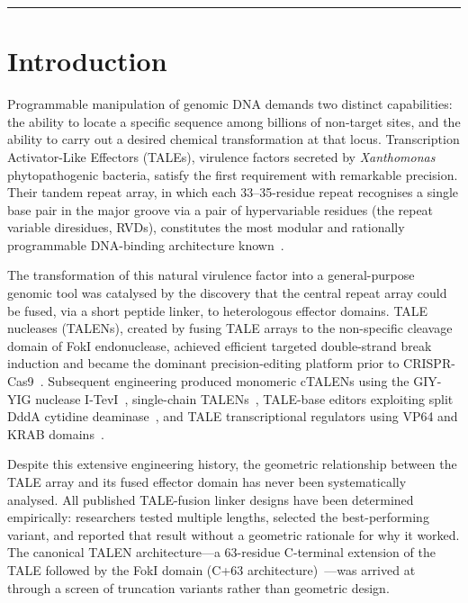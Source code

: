 \documentclass[11pt,a4paper]{article}
\begin{document}
\noindent\rule{\linewidth}{0.4pt}
\vspace{0.5em}

\section{Introduction}
\label{sec:intro}

Programmable manipulation of genomic DNA demands two distinct capabilities: the
ability to locate a specific sequence among billions of non-target sites, and the
ability to carry out a desired chemical transformation at that locus. Transcription
Activator-Like Effectors (TALEs), virulence factors secreted by \textit{Xanthomonas}
phytopathogenic bacteria, satisfy the first requirement with remarkable precision.
Their tandem repeat array, in which each 33--35-residue repeat recognises a single
base pair in the major groove via a pair of hypervariable residues (the repeat variable
diresidues, RVDs), constitutes the most modular and rationally programmable DNA-binding
architecture known~\citep{Boch2009, Moscou2009}.

The transformation of this natural virulence factor into a general-purpose genomic tool
was catalysed by the discovery that the central repeat array could be fused, via a short
peptide linker, to heterologous effector domains. TALE nucleases (TALENs), created by
fusing TALE arrays to the non-specific cleavage domain of FokI endonuclease, achieved
efficient targeted double-strand break induction and became the dominant precision-editing
platform prior to CRISPR-Cas9~\citep{Miller2011, Cermak2011}. Subsequent engineering
produced monomeric cTALENs using the GIY-YIG nuclease I-TevI~\citep{Beurdeley2013},
single-chain TALENs~\citep{Sun2014}, TALE-base editors exploiting split DddA cytidine
deaminase~\citep{Mok2020}, and TALE transcriptional regulators using VP64 and KRAB
domains~\citep{Zhang2011, Garg2012}.

Despite this extensive engineering history, the geometric relationship between the
TALE array and its fused effector domain has never been systematically analysed.
All published TALE-fusion linker designs have been determined empirically: researchers
tested multiple lengths, selected the best-performing variant, and reported that result
without a geometric rationale for why it worked. The canonical TALEN architecture---a
63-residue C-terminal extension of the TALE followed by the FokI domain (C+63
architecture)~\citep{Miller2011}---was arrived at through a screen of truncation
variants rather than geometric design.
\end{document}
